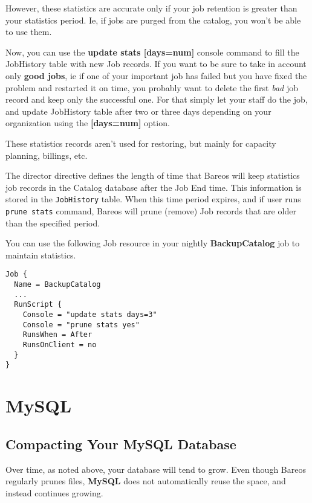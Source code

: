 However, these statistics are accurate only if your job retention is greater
than your statistics period. Ie, if jobs are purged from the catalog, you won't
be able to use them.

Now, you can use the \textbf{update stats [days=num]} console command to fill
the JobHistory table with new Job records. If you want to be sure to take in
account only \textbf{good jobs}, ie if one of your important job has failed but
you have fixed the problem and restarted it on time, you probably want to
delete the first \textit{bad} job record and keep only the successful one. For
that simply let your staff do the job, and update JobHistory table after two or
three days depending on your organization using the \textbf{[days=num]} option.

These statistics records aren't used for restoring, but mainly for
capacity planning, billings, etc.

The  director directive defines
the length of time that Bareos will keep statistics job records in the Catalog
database after the Job End time. This information is stored in the \texttt{JobHistory} table.
When this time
period expires, and if user runs \texttt{prune stats} command, Bareos will
prune (remove) Job records that are older than the specified period.

You can use the following Job resource in your nightly \textbf{BackupCatalog}
job to maintain statistics.
\begin{verbatim}
Job {
  Name = BackupCatalog
  ...
  RunScript {
    Console = "update stats days=3"
    Console = "prune stats yes"
    RunsWhen = After
    RunsOnClient = no
  }
}
\end{verbatim}



\section{MySQL}
\label{CompactingMySQL}
\subsection{Compacting Your MySQL Database}

Over time, as noted above, your database will tend to grow.
Even though Bareos regularly prunes files, {\bf MySQL} does not automatically
reuse the space, and instead continues growing.

